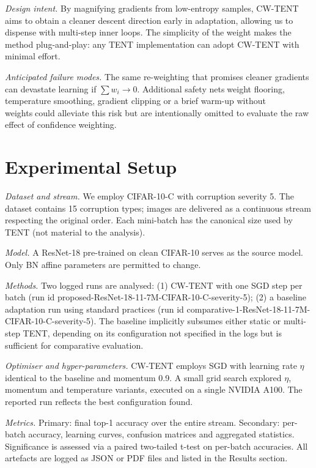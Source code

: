 \documentclass{article} %
\begin{document}
\textit{Design intent.} By magnifying gradients from low-entropy samples, CW-TENT aims to obtain a cleaner descent direction early in adaptation, allowing us to dispense with multi-step inner loops. The simplicity of the weight makes the method plug-and-play: any TENT implementation can adopt CW-TENT with minimal effort.

\textit{Anticipated failure modes.} The same re-weighting that promises cleaner gradients can devastate learning if \(\sum w_i \to 0\). Additional safety netsweight flooring, temperature smoothing, gradient clipping or a brief warm-up without weightscould alleviate this risk but are intentionally omitted to evaluate the raw effect of confidence weighting.

\section{Experimental Setup}
\label{sec:experimental}
\textit{Dataset and stream.} We employ CIFAR-10-C with corruption severity 5. The dataset contains 15 corruption types; images are delivered as a continuous stream respecting the original order. Each mini-batch has the canonical size used by TENT (not material to the analysis).

\textit{Model.} A ResNet-18 pre-trained on clean CIFAR-10 serves as the source model. Only BN affine parameters are permitted to change.

\textit{Methods.} Two logged runs are analysed: (1) CW-TENT with one SGD step per batch (run id proposed-ResNet-18-11-7M-CIFAR-10-C-severity-5); (2) a baseline adaptation run using standard practices (run id comparative-1-ResNet-18-11-7M-CIFAR-10-C-severity-5). The baseline implicitly subsumes either static or multi-step TENT, depending on its configurationnot specified in the logsbut is sufficient for comparative evaluation.

\textit{Optimiser and hyper-parameters.} CW-TENT employs SGD with learning rate \(\eta\) identical to the baseline and momentum 0.9. A small grid search explored \(\eta\), momentum and temperature variants, executed on a single NVIDIA A100. The reported run reflects the best configuration found.

\textit{Metrics.} Primary: final top-1 accuracy over the entire stream. Secondary: per-batch accuracy, learning curves, confusion matrices and aggregated statistics. Significance is assessed via a paired two-tailed t-test on per-batch accuracies. All artefacts are logged as JSON or PDF files and listed in the Results section.
\end{document}
